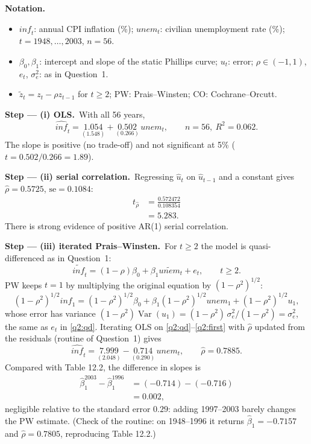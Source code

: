 \documentclass[11pt,a4paper]{article}
\numberwithin{equation}{questao}
\newenvironment{notacao}{\par\smallskip\noindent\textbf{Notation.}\begin{itemize}[leftmargin=1.4em,topsep=1pt,itemsep=0pt]\small}{\end{itemize}}
\newcommand{\passo}[2]{\par\smallskip\noindent\textbf{Step --- #1.}~#2}
\newcommand{\var}[1]{\mathit{#1}}
\begin{document}
\begin{sol}
\begin{notacao}
\item $\var{inf}_t$: annual CPI inflation (\%); $\var{unem}_t$: civilian unemployment rate (\%); $t=1948,\dots,2003$, $n=56$.
\item $\beta_0,\beta_1$: intercept and slope of the static Phillips curve; $u_t$: error; $\rho\in(-1,1)$, $e_t$, $\sigma_e^2$: as in Question~1.
\item $\tilde z_t=z_t-\rho z_{t-1}$ for $t\ge2$; PW: Prais--Winsten; CO: Cochrane--Orcutt.
\end{notacao}

\passo{(i) OLS}{With all 56 years,
\begin{equation}
\widehat{\var{inf}}_t=\underset{(1.548)}{1.054}+\underset{(0.266)}{0.502}\,\var{unem}_t,\qquad n=56,\ R^2=0.062. \label{q2:ols}
\end{equation}
The slope is positive (no trade-off) and not significant at 5\% ($t=0.502/0.266=1.89$).}

\passo{(ii) serial correlation}{Regressing $\hat u_t$ on $\hat u_{t-1}$ and a constant gives $\hat\rho=0.5725$, $\mathrm{se}=0.1084$:
\begin{align*}
t_{\hat\rho} &= \frac{0.572472}{0.108354}\\
&= 5.283 .
\end{align*}
There is strong evidence of positive AR(1) serial correlation.}

\passo{(iii) iterated Prais--Winsten}{For $t\ge2$ the model is quasi-differenced as in Question~1:
\begin{equation}
\widetilde{\var{inf}}_t=(1-\rho)\beta_0+\beta_1\widetilde{\var{unem}}_t+e_t,\qquad t\ge2. \label{q2:qd}
\end{equation}
PW keeps $t=1$ by multiplying the original equation by $(1-\rho^2)^{1/2}$:
\begin{equation}
(1-\rho^2)^{1/2}\var{inf}_1=(1-\rho^2)^{1/2}\beta_0+\beta_1(1-\rho^2)^{1/2}\var{unem}_1+(1-\rho^2)^{1/2}u_1, \label{q2:first}
\end{equation}
whose error has variance $(1-\rho^2)\operatorname{Var}(u_1)=(1-\rho^2)\,\sigma_e^2/(1-\rho^2)=\sigma_e^2$, the
same as $e_t$ in \eqref{q2:qd}. Iterating OLS on \eqref{q2:qd}--\eqref{q2:first} with $\hat\rho$ updated
from the residuals (routine of Question~1) gives
\begin{equation}
\widehat{\var{inf}}_t=\underset{(2.048)}{7.999}-\underset{(0.290)}{0.714}\,\var{unem}_t,\qquad \hat\rho=0.7885. \label{q2:pw}
\end{equation}
Compared with Table 12.2, the difference in slopes is
\begin{align*}
\hat\beta_1^{2003}-\hat\beta_1^{1996} &= (-0.714)-(-0.716)\\
&= 0.002,
\end{align*}
negligible relative to the standard error $0.29$: adding 1997--2003 barely changes the PW estimate.
(Check of the routine: on 1948--1996 it returns $\hat\beta_1=-0.7157$ and $\hat\rho=0.7805$,
reproducing Table 12.2.)}


\end{sol}
\end{document}
